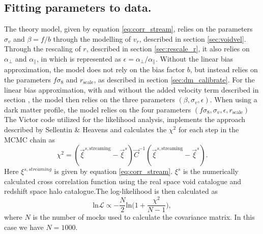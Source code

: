 \subsection{Fitting parameters to data.}
The theory model, given by equation \ref{eq:corr_stream}, relies on the parameters $\sigma_v$ and $\beta=f/b$ through the modelling of $v_r$, described in section \ref{sec:voidvel}. Through the rescaling of $r$, described in section \ref{sec:rescale_r}, it also relies on $\alpha_\perp$ and $\alpha_\parallel$, in which is represented as $\epsilon=\alpha_\perp/\alpha_\parallel$.
Without the linear bias approximation, the model does not rely on the bias factor $b$, but instead relies on the parameters $f\sigma_8$ and $r_\mathrm{scale}$, as described in section \ref{sec:dm_calibrate}. For the linear bias approximation, with and without the added velocity term described in section , the model then relies on the three parameters $(\beta,\sigma_v,\epsilon)$. When using a dark matter profile, the model relies on the four parameters $(f\sigma_8, \sigma_v, \epsilon, r_\mathrm{scale})$
\\\indent
The Victor code utilized for the likelihood analysis, implements the approach described by Sellentin \& Heavens \cite{heavens2010statistical} and calculates the $\chi^2$ for each step in the MCMC chain as
\begin{equation}
    \chi^2=(\vec{\xi}^{s,\mathrm{streaming}}-\vec{\xi}^{s})\vec{C}^{-1}(\vec{\xi}^{s,\mathrm{streaming}}-\vec{\xi}^{s}).
\end{equation}
Here $\xi^{s,streaming}$ is given by equation \ref{eq:corr_stream}. $\xi^s$ is the numerically calculated cross correlation function using the real space void catalogue and redshift space halo catalogue.The log-likelihood is then calculated as
\begin{equation}
    \mathrm{ln}\mathcal{L}\propto-\frac{N}{2}\mathrm{ln}\big(1+\frac{\chi^2}{N-1}\big),
\end{equation}
where $N$ is the number of mocks used to calculate the covariance matrix. In this case we have $N=1000$.